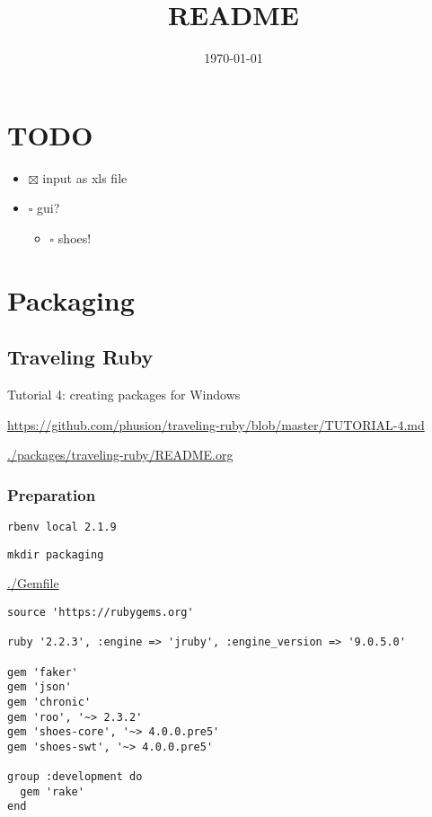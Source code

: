 \documentclass[11pt]{article}
\date{\today}
\title{README}
\begin{document}
\maketitle
\tableofcontents

\section{{\bfseries\sffamily TODO} }
\label{sec-1}

\begin{itemize}
\item $\boxtimes$ input as xls file
\item $\square$ gui?
\begin{itemize}
\item $\square$ shoes!
\end{itemize}
\end{itemize}


\section{Packaging}
\label{sec-2}

\subsection{Traveling Ruby}
\label{sec-2-1}

Tutorial 4: creating packages for Windows

\url{https://github.com/phusion/traveling-ruby/blob/master/TUTORIAL-4.md}

\url{./packages/traveling-ruby/README.org}

\subsubsection{Preparation}
\label{sec-2-1-1}

\begin{verbatim}
rbenv local 2.1.9
\end{verbatim}

\begin{verbatim}
mkdir packaging
\end{verbatim}

\url{./Gemfile}

\begin{verbatim}
source 'https://rubygems.org'

ruby '2.2.3', :engine => 'jruby', :engine_version => '9.0.5.0'

gem 'faker'
gem 'json'
gem 'chronic'
gem 'roo', '~> 2.3.2'
gem 'shoes-core', '~> 4.0.0.pre5'
gem 'shoes-swt', '~> 4.0.0.pre5'

group :development do
  gem 'rake'
end
\end{verbatim}
\end{document}
